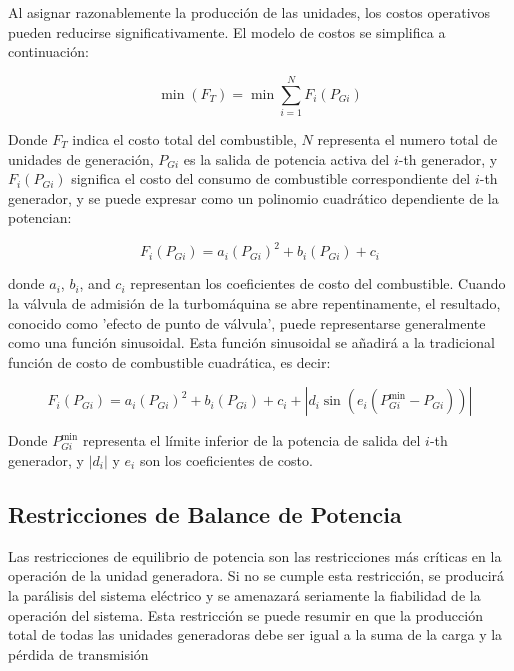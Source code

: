 \documentclass[11pt]{article}
\begin{document}
Al asignar razonablemente la producción de las unidades, los costos operativos pueden reducirse significativamente. 
El modelo de costos se simplifica a continuación:

\begin{equation}
    \min (F_T) =\min  \sum_{i=1}^{N} F_i(P_{Gi})
\end{equation}

Donde \( F_T \) indica el costo total del combustible, \( N \) representa el numero total de unidades de generación, 
\( P_{Gi} \) es la salida de potencia activa del \( i \)-th generador, y \( F_i(P_{Gi}) \) significa el costo del consumo 
de combustible correspondiente del \( i \)-th generador, y se puede expresar como un polinomio cuadrático dependiente de 
la potencian:

\begin{equation}
    F_i(P_{Gi}) = a_i(P_{Gi})^2 + b_i(P_{Gi}) + c_i
\end{equation}

donde \( a_i \), \( b_i \), and \( c_i \) representan los coeficientes de costo del combustible. Cuando la válvula de 
admisión de la turbomáquina se abre repentinamente, el resultado, conocido como 'efecto de punto de válvula', 
puede representarse generalmente como una función sinusoidal. Esta función sinusoidal se añadirá a la tradicional 
función de costo de combustible cuadrática, es decir:

\begin{equation}
    F_i(P_{Gi}) = a_i(P_{Gi})^2 + b_i(P_{Gi}) + c_i + |d_i \sin(e_i (P_{Gi}^{\min} - P_{Gi}))|
\end{equation}

Donde \( P_{Gi}^{\min} \) representa el límite inferior de la potencia de salida del \( i \)-th generador, 
y \( |d_i| \) y \( e_i \) son los coeficientes de costo. 

\subsection{Restricciones de Balance de Potencia}
Las restricciones de equilibrio de potencia son las restricciones más críticas en la operación de la unidad generadora. 
Si no se cumple esta restricción, se producirá la parálisis del sistema eléctrico y se amenazará seriamente la fiabilidad
 de la operación del sistema. Esta restricción se puede resumir en que la producción total de todas las unidades generadoras 
 debe ser igual a la suma de la carga y la pérdida de transmisión
\end{document}
